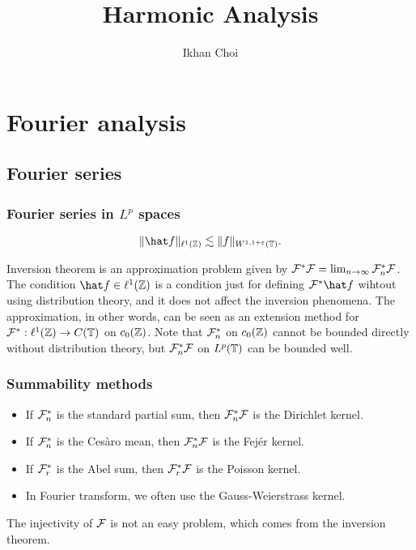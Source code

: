 \documentclass{../../large}
\begin{document}
\title{Harmonic Analysis}
\author{Ikhan Choi}
\maketitle
\tableofcontents

\part{Fourier analysis}

\chapter{Fourier series}

\section{Fourier series in $L^p$ spaces}
\begin{prb}
\[\|\hat f\|_{\ell^1(\Z)}\lesssim\|f\|_{W^{1,1+\e}(\T)}.\]
\end{prb}

Inversion theorem is an approximation problem given by $\mathcal{F}^*\mathcal{F}=\lim_{n\to\infty}\mathcal{F}_n^*\mathcal{F}$.
The condition $\hat f\in\ell^1(\Z)$ is a condition just for defining $\cF^*\hat f$ wihtout using distribution theory, and it does not affect the inversion phenomena.
The approximation, in other words, can be seen as an extension method for $\mathcal{F}^*:\ell^1(\mathbb{Z})\to C(\mathbb{T})$ on $c_0(\mathbb{Z})$.
Note that $\mathcal{F}_n^*$ on $c_0(\mathbb{Z})$ cannot be bounded directly without distribution theory, but $\mathcal{F}_n^*\mathcal{F}$ on $L^p(\mathbb{T})$ can be bounded well.

\section{Summability methods}
\begin{itemize}
\item If $\mathcal{F}_n^*$ is the standard partial sum, then $\mathcal{F}_n^*\mathcal{F}$ is the Dirichlet kernel.
\item If $\mathcal{F}_n^*$ is the Ces\`aro mean, then $\mathcal{F}_n^*\mathcal{F}$ is the Fej\'er kernel.
\item If $\mathcal{F}_r^*$ is the Abel sum, then $\mathcal{F}_r^*\mathcal{F}$ is the Poisson kernel.
\item In Fourier transform, we often use the Gauss-Weierstrass kernel.
\end{itemize}

The injectivity of $\mathcal{F}$ is not an easy problem, which comes from the inversion theorem.
\end{document}
